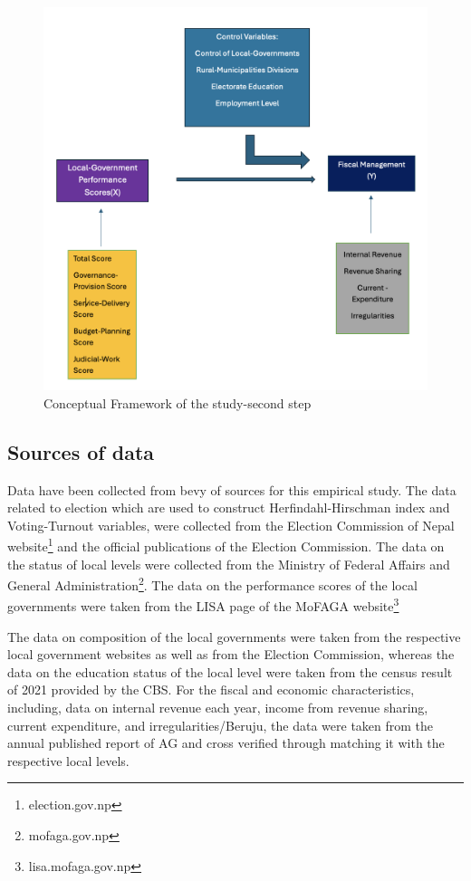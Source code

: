 \begin{figure}[h!]
\centering
\hspace{-1cm}
\includegraphics[width = 160mm, scale = 0.35]{figure/Conframe2.png}
\caption{Conceptual Framework of the study-second step}
\label{Conceptual Framework step 2}
\end{figure}

\subsection{Sources of data}
Data have been collected from bevy of sources for this empirical study. The data related to election which are used to construct Herfindahl-Hirschman index and Voting-Turnout variables, were collected from the Election Commission of Nepal website\footnote{election.gov.np} and the official publications of the Election Commission. The data on the status of local levels were collected from the Ministry of Federal Affairs and General Administration\footnote{mofaga.gov.np}. The data on the performance scores of the local governments were taken from the LISA page of the MoFAGA website\footnote{lisa.mofaga.gov.np}  \par
The data on  composition of the local governments were taken from the respective local government websites as well as from the Election Commission, whereas the data on the education status of the local level were taken from the census result of 2021 provided by the CBS. For the fiscal and economic characteristics, including, data on internal revenue each year, income from revenue sharing, current expenditure, and irregularities/Beruju, the data were taken from the annual published report of AG and cross verified through matching it with the respective local levels.
\vspace{-5mm}
